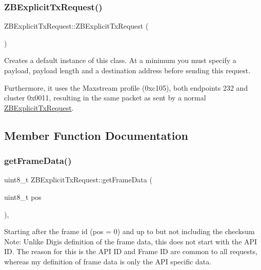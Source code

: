 \subsubsection{\texorpdfstring{Z\+B\+Explicit\+Tx\+Request()}{ZBExplicitTxRequest()}\hspace{0.1cm}{\footnotesize\ttfamily [3/3]}}
{\footnotesize\ttfamily Z\+B\+Explicit\+Tx\+Request\+::\+Z\+B\+Explicit\+Tx\+Request (\begin{DoxyParamCaption}{ }\end{DoxyParamCaption})}

Creates a default instance of this class. At a minimum you must specify a payload, payload length and a destination address before sending this request.

Furthermore, it uses the Maxstream profile (0xc105), both endpoints 232 and cluster 0x0011, resulting in the same packet as sent by a normal \hyperlink{class_z_b_explicit_tx_request}{Z\+B\+Explicit\+Tx\+Request}. 

\subsection{Member Function Documentation}
\hypertarget{class_z_b_explicit_tx_request_a3d961e023bcf422543f65ed04da2240a}{}\label{class_z_b_explicit_tx_request_a3d961e023bcf422543f65ed04da2240a} 
\subsubsection{\texorpdfstring{get\+Frame\+Data()}{getFrameData()}}
{\footnotesize\ttfamily uint8\+\_\+t Z\+B\+Explicit\+Tx\+Request\+::get\+Frame\+Data (\begin{DoxyParamCaption}\item[{uint8\+\_\+t}]{pos }\end{DoxyParamCaption})\hspace{0.3cm}{\ttfamily [protected]}, {\ttfamily [virtual]}}

Starting after the frame id (pos = 0) and up to but not including the checksum Note\+: Unlike Digi\textquotesingle{}s definition of the frame data, this does not start with the A\+PI ID. The reason for this is the A\+PI ID and Frame ID are common to all requests, whereas my definition of frame data is only the A\+PI specific data. 

